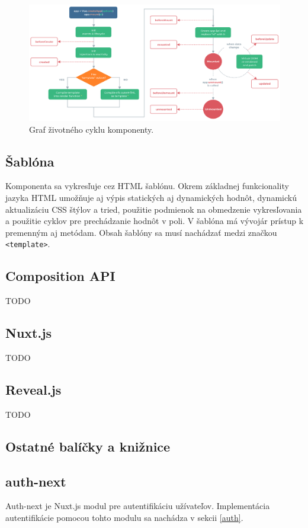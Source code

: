     \begin{figure}[!hbt]
        \centering
        \includegraphics[scale=0.3]{obrazky/lifecycle.png}
        \caption{Graf životného cyklu komponenty\cite{vue-guide}.}
        \label{pic:components}
    \end{figure}

\subsection*{Šablóna}
Komponenta sa vykresľuje cez HTML šablónu. Okrem základnej funkcionality jazyka HTML umožňuje aj výpis statických aj dynamických hodnôt, dynamickú aktualizáciu CSS štýlov a tried, použitie podmienok na obmedzenie vykresľovania a použitie cyklov pre prechádzanie hodnôt v poli. V šablóna má vývojár prístup k premenným aj metódam. Obsah šablóny sa musí nachádzať medzi značkou \texttt{<template>}.

\subsection{Composition API}
\label{compositionapi}
TODO

\subsection{Nuxt.js}
TODO

\subsection{Reveal.js}
TODO

\subsection{Ostatné balíčky a knižnice}
\subsection*{auth-next}
Auth-next je Nuxt.js modul pre autentifikáciu užívateľov. Implementácia autentifikácie pomocou tohto modulu sa nachádza v sekcii \ref{auth}.

